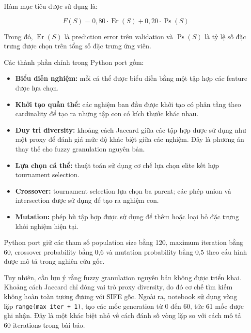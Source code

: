 Hàm mục tiêu được sử dụng là:

\begin{equation}
    F(S)
    =
    0{,}80 \cdot \operatorname{Er}(S)
    +
    0{,}20 \cdot \operatorname{Ps}(S)
    \label{eq:implemented-sife-objective}
\end{equation}

Trong đó, $\operatorname{Er}(S)$ là prediction error trên
validation và $\operatorname{Ps}(S)$ là tỷ lệ số đặc trưng
được chọn trên tổng số đặc trưng ứng viên.

Các thành phần chính trong Python port gồm:

\begin{itemize}
    \item \textbf{Biểu diễn nghiệm:} mỗi cá thể được biểu diễn
    bằng một tập hợp các feature được lựa chọn.

    \item \textbf{Khởi tạo quần thể:} các nghiệm ban đầu được
    khởi tạo có phân tầng theo cardinality để tạo ra những
    tập con có kích thước khác nhau.

    \item \textbf{Duy trì diversity:} khoảng cách Jaccard giữa
    các tập hợp được sử dụng như một proxy để đánh giá mức độ
    khác biệt giữa các nghiệm. Đây là phương án thay thế cho
    fuzzy granulation nguyên bản.

    \item \textbf{Lựa chọn cá thể:} thuật toán sử dụng cơ chế
    lựa chọn elite kết hợp tournament selection.

    \item \textbf{Crossover:} tournament selection lựa chọn
    ba parent; các phép union và intersection được sử dụng
    để tạo ra nghiệm con.

    \item \textbf{Mutation:} phép bù tập hợp được sử dụng để
    thêm hoặc loại bỏ đặc trưng khỏi nghiệm hiện tại.
\end{itemize}

Python port giữ các tham số population size bằng 120,
maximum iteration bằng 60, crossover probability bằng 0,6
và mutation probability bằng 0,5 theo cấu hình được mô tả
trong nghiên cứu gốc.

Tuy nhiên, cần lưu ý rằng fuzzy granulation nguyên bản không
được triển khai. Khoảng cách Jaccard chỉ đóng vai trò proxy
diversity, do đó cơ chế tìm kiếm không hoàn toàn tương đương
với SIFE gốc. Ngoài ra, notebook sử dụng vòng lặp
\texttt{range(max\_iter + 1)}, tạo các mốc generation từ 0
đến 60, tức 61 mốc được ghi nhận. Đây là một khác biệt nhỏ
về cách đánh số vòng lặp so với cách mô tả 60 iterations
trong bài báo.

